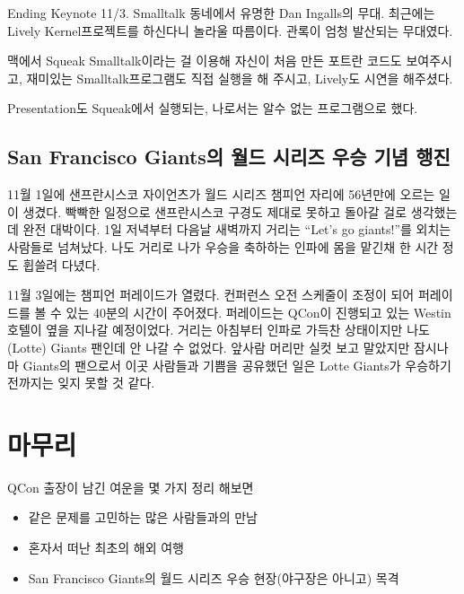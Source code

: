 \documentclass[11pt]{article}
\begin{document}
Ending Keynote 11/3. Smalltalk 동네에서 유명한 Dan Ingalls의 무대.
최근에는 Lively Kernel프로젝트를 하신다니 놀라울 따름이다.
관록이 엄청 발산되는 무대였다.
 
맥에서 Squeak Smalltalk이라는 걸 이용해 자신이 처음 만든 포트란 코드도
보여주시고, 재미있는 Smalltalk프로그램도 직접 실행을 해 주시고,
Lively도 시연을 해주셨다.
 
Presentation도 Squeak에서 실행되는, 나로서는 알수 없는 프로그램으로 했다.

\subsection{San Francisco Giants의 월드 시리즈 우승 기념 행진}

11월 1일에 샌프란시스코 자이언츠가 월드 시리즈 챔피언 자리에
56년만에 오르는 일이 생겼다. 빡빡한 일정으로 샌프란시스코 구경도 제대로
못하고 돌아갈 걸로 생각했는데 완전 대박이다. 1일 저녁부터 다음날 새벽까지 
거리는 ``Let's go giants!''를 외치는 사람들로 넘쳐났다. 나도 거리로 나가
우승을 축하하는 인파에 몸을 맡긴채 한 시간 정도 휩쓸려 다녔다. 

11월 3일에는 챔피언 퍼레이드가 열렸다. 컨퍼런스 오전 스케줄이 조정이 
되어 퍼레이드를 볼 수 있는 40분의 시간이 주어졌다.  
퍼레이드는 QCon이 진행되고 있는 Westin호텔이 옆을 지나갈 예정이었다.
거리는 아침부터 인파로 가득찬 상태이지만 나도 (Lotte) Giants 팬인데 안
나갈 수 없었다.
앞사람 머리만 실컷 보고 말았지만 잠시나마 Giants의 팬으로서 이곳
사람들과 기쁨을 공유했던 일은 Lotte Giants가 우승하기 전까지는 잊지
못할 것 같다.

\section{마무리}

QCon 출장이 남긴 여운을 몇 가지 정리 해보면
\begin{itemize}
\item 같은 문제를 고민하는 많은 사람들과의 만남
\item 혼자서 떠난 최초의 해외 여행
\item San Francisco Giants의 월드 시리즈 우승 현장(야구장은 아니고) 목격
\end{itemize}

% 

\pagebreak



\end{document}
